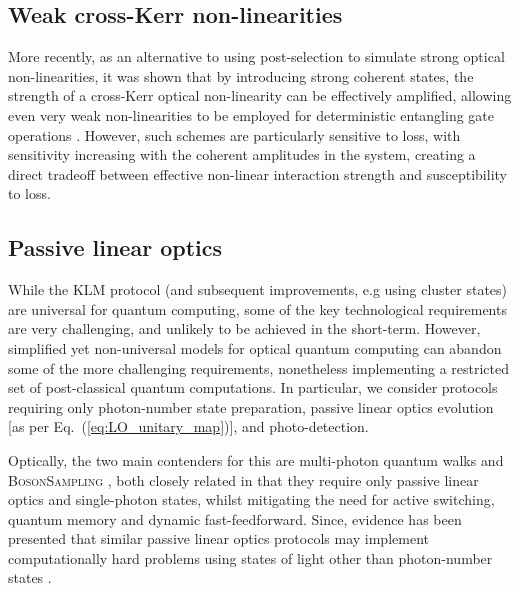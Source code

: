%
%

\subsection{Weak cross-Kerr non-linearities} 

More recently, as an alternative to using post-selection to simulate strong optical non-linearities, it was shown that by introducing strong coherent states, the strength of a cross-Kerr optical non-linearity can be effectively amplified, allowing even very weak non-linearities to be employed for deterministic entangling gate operations \cite{bib:Munro05}. However, such schemes are particularly sensitive to loss, with sensitivity increasing with the coherent amplitudes in the system, creating a direct tradeoff between effective non-linear interaction strength and susceptibility to loss.


%
%

\subsection{Passive linear optics} \label{sec:passive_LO} 

While the KLM protocol (and subsequent improvements, e.g using cluster states) are universal for quantum computing, some of the key technological requirements are very challenging, and unlikely to be achieved in the short-term. However, simplified yet non-universal models for optical quantum computing can abandon some of the more challenging requirements, nonetheless implementing a restricted set of post-classical quantum computations. In particular, we consider protocols requiring only photon-number state preparation, passive linear optics evolution [as per Eq.~(\ref{eq:LO_unitary_map})], and photo-detection.

Optically, the two main contenders for this are multi-photon quantum walks \cite{bib:Aharonov93, bib:Aharonov01, bib:Kempe03, bib:Childs09, bib:Salvador12, bib:RohdeMultiWalk11} and \textsc{BosonSampling} \cite{bib:AaronsonArkhipov10, bib:RohdeIntroBS15}, both closely related in that they require only passive linear optics and single-photon states, whilst mitigating the need for active switching, quantum memory and dynamic fast-feedforward. Since, evidence has been presented that similar passive linear optics protocols may implement computationally hard problems using states of light other than photon-number states \cite{bib:RandBS, bib:RohdePhotAdd15, bib:RohdeDisp15, bib:RohdeCat15}.

